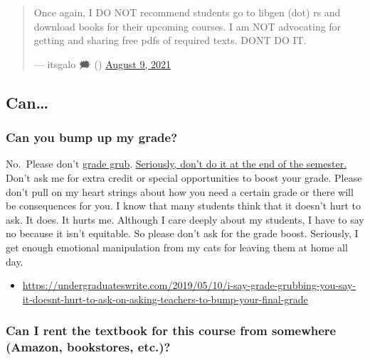 \begin{quote}
Once again, I DO NOT recommend students go to libgen (dot) rs and
download books for their upcoming courses. I am NOT advocating for
getting and sharing free pdfs of required texts. DON\textquotesingle T DO IT.

\begin{flushright}--- itsgalo 🗯 (\citet{GaloAndStuff}) \href{https://twitter.com/GaloAndStuff/status/1424818560417902604}{August 9,
2021}\end{flushright}
\end{quote}

\hypertarget{can}{%
\subsection{Can\ldots{}}\label{can}}

\hypertarget{can-you-bump-up-my-grade}{%
\subsubsection{Can you bump up my grade?}\label{can-you-bump-up-my-grade}}

No.~Please don't \href{https://undergraduateswrite.com/2019/05/10/i-say-grade-grubbing-you-say-it-doesnt-hurt-to-ask-on-asking-teachers-to-bump-your-final-grade/}{grade grub}. \href{https://undergraduateswrite.com/2019/05/10/i-say-grade-grubbing-you-say-it-doesnt-hurt-to-ask-on-asking-teachers-to-bump-your-final-grade/}{Seriously, don't do it at the end of the semester.} Don't ask me for extra credit or special opportunities to boost your grade. Please don't pull on my heart strings about how you need a certain grade or there will be consequences for you. I know that many students think that it doesn't hurt to ask. It does. It hurts me. Although I care deeply about my students, I have to say no because it isn't equitable. So please don't ask for the grade boost. Seriously, I get enough emotional manipulation from my cats for leaving them at home all day.

\begin{itemize}
\tightlist
\item
  \url{https://undergraduateswrite.com/2019/05/10/i-say-grade-grubbing-you-say-it-doesnt-hurt-to-ask-on-asking-teachers-to-bump-your-final-grade}
\end{itemize}

\hypertarget{can-i-rent-the-textbook-for-this-course-from-somewhere-amazon-bookstores-etc.}{%
\subsubsection{Can I rent the textbook for this course from somewhere (Amazon, bookstores, etc.)?}\label{can-i-rent-the-textbook-for-this-course-from-somewhere-amazon-bookstores-etc.}}


